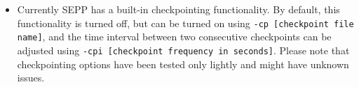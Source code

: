 \documentclass[11pt]{article} %
\newcommand{\sepp}{SEPP\xspace}
\newcommand{\ins}[1]{{\tt #1}}
\newcommand{\file}[1]{{\sf #1}}
\newcommand{\pplacer}{pplacer\xspace}
\begin{document}
\begin{itemize}
tells \sepp that \pplacer binaries can be found under \file{/some/path}.

An example config file is available as part of the distribution under the test directory (\file{test/unittest/data/simulated/sample.config}). 
A main configuration file under \file{\{home\}/.sepp/main.config} is used
to store some basic configurations such as the location of extra programs, etc.
When conflicting options are given, precedence is with those provided through commandline, then those specified in config file provided using \ins{-c} option and finally those specified in the main config file. 

\item Currently \sepp has a built-in checkpointing functionality.
By default, this functionality is turned off, but can be turned on using \ins{-cp [checkpoint file name]}, 
and the time interval between two consecutive checkpoints can be adjusted using \ins{-cpi [checkpoint frequency in seconds]}.
Please note that checkpointing options have been tested only lightly and might have unknown issues. 
\end{itemize}




\end{document}
